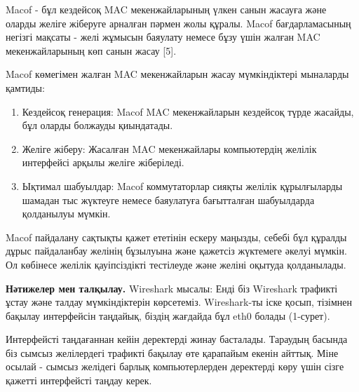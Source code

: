 \begin{multicols}{2}
Macof - бұл кездейсоқ MAC мекенжайларының үлкен санын жасауға және
оларды желіге жіберуге арналған пәрмен жолы құралы. Macof
бағдарламасының негізгі мақсаты - желі жұмысын баяулату немесе бұзу үшін
жалған MAC мекенжайларының көп санын жасау {[}5{]}.

Macof көмегімен жалған MAC мекенжайларын жасау мүмкіндіктері мыналарды
қамтиды:

\begin{enumerate}
\def\labelenumi{\arabic{enumi}.}
\item
  Кездейсоқ генерация: Macof MAC мекенжайларын кездейсоқ түрде жасайды,
  бұл оларды болжауды қиындатады.
\item
  Желіге жіберу: Жасалған MAC мекенжайлары компьютердің желілік
  интерфейсі арқылы желіге жіберіледі.
\item
  Ықтимал шабуылдар: Macof коммутаторлар сияқты желілік құрылғыларды
  шамадан тыс жүктеуге немесе баяулатуға бағытталған шабуылдарда
  қолданылуы мүмкін.
\end{enumerate}

Macof пайдалану сақтықты қажет ететінін ескеру маңызды, себебі бұл
құралды дұрыс пайдаланбау желінің бұзылуына және қажетсіз жүктемеге
әкелуі мүмкін. Ол көбінесе желілік қауіпсіздікті тестілеуде және желіні
оқытуда қолданылады.

{\bfseries Нәтижелер мен талқылау.} Wireshark мысалы: Енді біз Wireshark
трафикті ұстау және талдау мүмкіндіктерін көрсетеміз. Wireshark-ты іске
қосып, тізімнен бақылау интерфейсін таңдайық, біздің жағдайда бұл eth0
болады (1-сурет).

Интерфейсті таңдағаннан кейін деректерді жинау басталады. Тараудың
басында біз сымсыз желілердегі трафикті бақылау өте қарапайым екенін
айттық. Міне осылай - сымсыз желідегі барлық компьютерлерден деректерді
көру үшін сізге қажетті интерфейсті таңдау керек.
\end{multicols}

